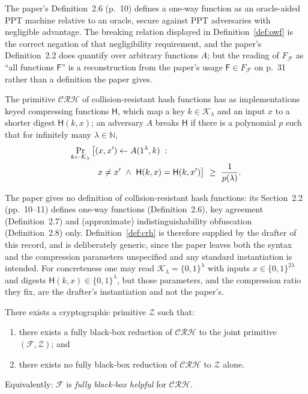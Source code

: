 \documentclass{aicr-conjecture}
\newcommand{\bits}{\{0,1\}}
\newcommand{\Fc}{\mathcal{F}}
\newcommand{\CRHc}{\mathcal{CRH}}
\newcommand{\Zc}{\mathcal{Z}}
\newcommand{\Kc}{\mathcal{K}}
\newcommand{\Fs}{\mathsf{F}}
\newcommand{\Hs}{\mathsf{H}}
\begin{document}
\begin{remark}\label{rem:owfrecon}
The paper's Definition~2.6 (p.~10) defines a one-way function as an
oracle-aided PPT machine relative to an oracle, secure against PPT
adversaries with negligible advantage. The breaking relation displayed in
Definition~\ref{def:owf} is the correct negation of that negligibility
requirement, and the paper's Definition~2.2 does quantify over arbitrary
functions $A$; but the reading of $F_{\Fc}$ as ``all functions $\Fs$'' is
a reconstruction from the paper's usage $\Fs\in F_{\Fc}$ on p.~31 rather
than a definition the paper gives.
\end{remark}

\begin{definition}\label{def:crh}
The primitive $\CRHc$ of collision-resistant hash functions has as
implementations keyed compressing functions $\Hs$, which map a key
$k\in\Kc_{\lambda}$ and an input $x$ to a shorter digest $\Hs(k,x)$; an
adversary $A$ breaks $\Hs$ if there is a polynomial $p$ such that for
infinitely many $\lambda\in\mathbb N$,
\begin{align*}
  \Pr_{k\sample\Kc_{\lambda}}\big[&(x,x')\sample A(1^{\lambda},k)\;:\\
    &\ x\neq x'\ \wedge\ \Hs(k,x)=\Hs(k,x')\big]
    \ \ge\ \frac{1}{p(\lambda)} .
\end{align*}
\end{definition}

\begin{remark}[the syntax of $\CRHc$ is not fixed by the
paper]\label{rem:crhrecon}
The paper gives no definition of collision-resistant hash functions:
its Section~2.2 (pp.~10--11) defines one-way functions (Definition~2.6),
key agreement (Definition~2.7) and (approximate) indistinguishability
obfuscation (Definition~2.8) only. Definition~\ref{def:crh} is therefore
supplied by the drafter of this record, and is deliberately generic,
since the paper leaves both the syntax and the compression parameters
unspecified and any standard instantiation is intended. For concreteness
one may read $\Kc_{\lambda}=\bits^{\lambda}$ with inputs
$x\in\bits^{2\lambda}$ and digests $\Hs(k,x)\in\bits^{\lambda}$, but
those parameters, and the compression ratio they fix, are the drafter's
instantiation and not the paper's.
\end{remark}

\begin{conjecture}\label{conj:main}
There exists a cryptographic primitive $\Zc$ such that:
\begin{enumerate}
\item there exists a fully black-box reduction of $\CRHc$ to the joint
  primitive $(\Fc,\Zc)$; and
\item there exists no fully black-box reduction of $\CRHc$ to $\Zc$
  alone.
\end{enumerate}
Equivalently: $\Fc$ is \emph{fully black-box helpful} for $\CRHc$.
\end{conjecture}
\end{document}
